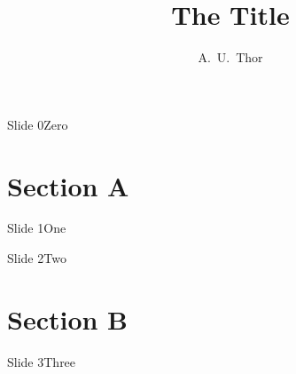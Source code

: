 \documentclass{beamer}
\title{The Title}
\author{A.~U.~Thor}
\begin{document}
\maketitle %
\begin{frame}{Slide 0}Zero\end{frame} %

\section{Section A}
\begin{frame}{Slide 1}One\end{frame}
\begin{frame}{Slide 2}Two\end{frame}

\section{Section B}
\begin{frame}{Slide 3}Three\end{frame}
\end{document}
